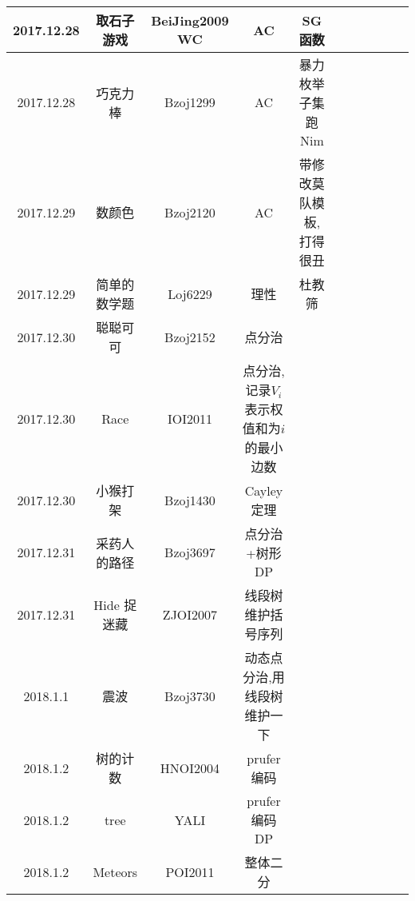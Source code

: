 \documentclass[landscape]{article}
\begin{document}
\begin{longtable}{ccccccccccc}
  \hline
  2017.12.28 & 取石子游戏 & BeiJing2009 WC & AC & SG函数\\
  \hline
  2017.12.28 & 巧克力棒 & Bzoj1299 & AC & 暴力枚举子集跑Nim\\
  \hline
  2017.12.29 & 数颜色 & Bzoj2120 & AC & 带修改莫队模板,打得很丑\\
  \hline
  2017.12.29 & 简单的数学题 & Loj6229 & 理性 & 杜教筛\\
  \hline
  2017.12.30 & 聪聪可可 & Bzoj2152 & 点分治\\
  \hline
  2017.12.30 & Race & IOI2011 & 点分治,记录$V_i$表示权值和为$i$的最小边数\\
  \hline
  2017.12.30 & 小猴打架 & Bzoj1430 & Cayley定理\\
  \hline
  2017.12.31 & 采药人的路径 & Bzoj3697 & 点分治+树形DP\\
  \hline
  2017.12.31 & Hide 捉迷藏 & ZJOI2007 & 线段树维护括号序列\\
  \hline
  2018.1.1 & 震波 & Bzoj3730 & 动态点分治,用线段树维护一下\\
  \hline
  2018.1.2 & 树的计数 & HNOI2004 & prufer编码\\
  \hline
  2018.1.2 & tree & YALI & prufer编码 DP\\
  \hline
  2018.1.2 & Meteors & POI2011 & 整体二分\\
  \hline
  
\end{longtable}
\end{document}
